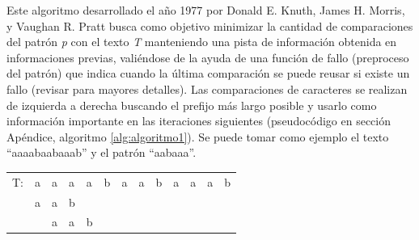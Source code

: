 Este algoritmo desarrollado el año 1977 por Donald E. Knuth, James H. Morris, y Vaughan R. Pratt busca como objetivo minimizar la cantidad de comparaciones del patrón \textit{p} con el texto \textit{T} manteniendo una pista de información obtenida en informaciones previas, valiéndose de la ayuda de una función de fallo (preproceso del patrón) que indica cuando la última comparación se puede reusar si existe un fallo (revisar \cite{knuthmorrispratt} para mayores detalles). Las comparaciones de caracteres se realizan de izquierda a derecha buscando el prefijo más largo posible y usarlo como información importante en las iteraciones siguientes (pseudocódigo en sección Apéndice, algoritmo \ref{alg:algoritmo1}). Se puede tomar como ejemplo el texto ``aaaabaabaaab'' y el patrón ``aabaaa''.
\\
\begin{table}[h]
\centering
\label{my-label6}
\begin{tabular}{lllllllllllll}
\cline{2-13}
\multicolumn{1}{l|}{T:} & \multicolumn{1}{l|}{a} & \multicolumn{1}{l|}{a} & \multicolumn{1}{l|}{a}                         & \multicolumn{1}{l|}{a}                         & \multicolumn{1}{l|}{b} & \multicolumn{1}{l|}{a}                         & \multicolumn{1}{l|}{a}                         & \multicolumn{1}{l|}{b}                         & \multicolumn{1}{l|}{a}                         & \multicolumn{1}{l|}{a}                         & \multicolumn{1}{l|}{a}                         & \multicolumn{1}{l|}{b} \\ \cline{2-13} 
\multicolumn{1}{l|}{}   & \multicolumn{1}{l|}{a} & \multicolumn{1}{l|}{a} & \multicolumn{1}{l|}{\cellcolor[HTML]{FD6864}b} &                                                &                        &                                                &                                                &                                                &                                                &                                                &                                                &                        \\ \cline{2-5}
                        & \multicolumn{1}{l|}{}  & \multicolumn{1}{l|}{a} & \multicolumn{1}{l|}{a}                         & \multicolumn{1}{l|}{\cellcolor[HTML]{FD6864}b} &                        &                                                &                                                &                                                &                                                &                                                &                                                &                        \\ \cline{3-9}

\end{tabular}
\end{table}
